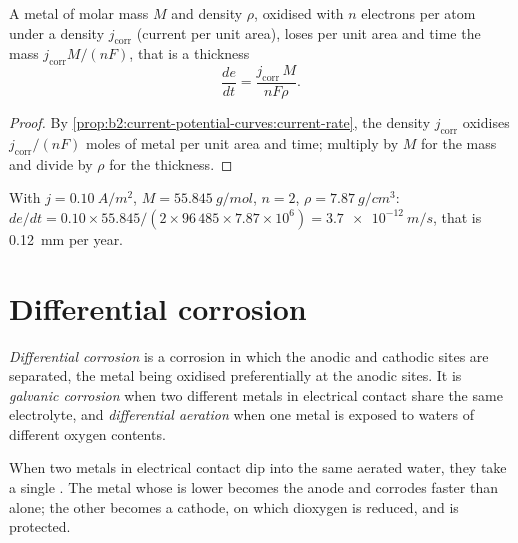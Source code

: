 \begin{proposition}\label{prop:b2:corrosion:rate}
A metal of molar mass $M$ and density $\rho$, oxidised with $n$ electrons per
atom under a  density $j_{\text{corr}}$ (current per unit area),
loses per unit area and time the mass $j_{\text{corr}}M/(nF)$, that is a
thickness
\[
  \frac{de}{dt} = \frac{j_{\text{corr}}\,M}{nF\rho} .
\]
\end{proposition}

\begin{proof}
By \cref{prop:b2:current-potential-curves:current-rate}, the 
density $j_{\text{corr}}$ oxidises $j_{\text{corr}}/(nF)$ moles of metal per unit area and
time; multiply by $M$ for the mass and divide by $\rho$ for the thickness.
\end{proof}

\begin{example}\label{ex:b2:corrosion:rate}
With $j = \qty{0.10}{A/m^2}$, $M = \qty{55.845}{g/mol}$, $n = 2$, $\rho =
\qty{7.87}{g/cm^3}$: $de/dt = 0.10 \times 55.845/(2 \times 96\,485 \times 7.87
\times 10^6) = \qty{3.7e-12}{m/s}$, that is \qty{0.12}{mm} per year.
\end{example}

\section{Differential corrosion}

\begin{definition}\label{def:b2:corrosion:differential}
\emph{Differential corrosion} is a corrosion in
which the anodic and cathodic sites are separated, the metal being
oxidised preferentially at the anodic sites. It is \emph{galvanic
corrosion} when two different metals in electrical
contact share the same electrolyte, and \emph{differential
aeration} when one metal is exposed to waters of
different oxygen contents.
\end{definition}

\begin{proposition}\label{prop:b2:corrosion:galvanic}
When two metals in electrical contact dip into the same aerated water, they
take a single . The metal whose  is lower
becomes the anode and corrodes faster than alone; the other becomes a cathode,
on which dioxygen is reduced, and is protected.
\end{proposition}

